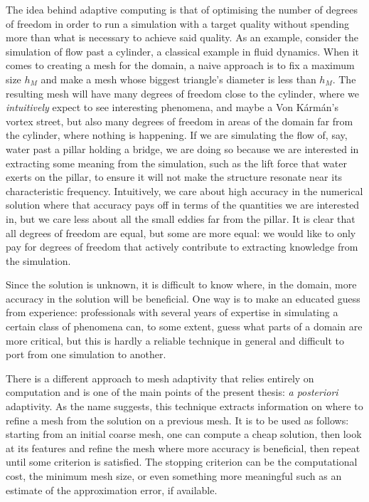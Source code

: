 The idea behind adaptive computing is that of optimising the number of
degrees of freedom in order to run a simulation with a target quality
without spending more than what is necessary to achieve said quality.
As an example, consider the simulation of flow past a cylinder, a
classical example in fluid dynamics.
When it comes to creating a mesh for the domain, a naive approach is to
fix a maximum size \(h_M\) and make a mesh whose biggest triangle's
diameter is less than \(h_M\).
The resulting mesh will have many degrees of freedom close to the
cylinder, where we \emph{intuitively} expect to see interesting phenomena, and maybe a Von
Kármán's vortex street, but also many degrees of freedom in areas of the
domain far from the cylinder, where nothing is happening.
If we are simulating the flow of, say, water past a pillar holding a
bridge, we are doing so because we are interested in extracting some
meaning from the simulation, such as the lift force that water exerts on the
pillar, to ensure it will not make the structure resonate near its
characteristic frequency.
Intuitively, we care about high accuracy in the numerical solution where
that accuracy pays off in terms of the quantities we are interested in,
but we care less about all the small eddies far from the pillar.
It is clear that all degrees of freedom are equal, but some are more
equal: we would like to only pay for degrees of freedom that actively
contribute to extracting knowledge from the simulation.

Since the solution is unknown, it is difficult to know where, in the
domain, more accuracy in the solution will be beneficial.
One way is to make an educated guess from experience: professionals with
several years of expertise in simulating a certain class of phenomena
can, to some extent, guess what parts of a domain are more critical, but
this is hardly a reliable technique in general and difficult to port from
one simulation to another.

There is a different approach to mesh adaptivity that relies entirely on
computation and is one of the main points of the present thesis: \emph{a
posteriori} adaptivity.
As the name suggests, this technique extracts information on where to
refine a mesh from the solution on a previous mesh.
It is to be used as follows: starting from an initial coarse mesh,
one can compute a cheap solution, then look at its features and refine
the mesh where more accuracy is beneficial, then repeat until some criterion
is satisfied.
The stopping criterion can be the computational cost, the minimum mesh
size, or even something more meaningful such as an estimate of the
approximation error, if available.

